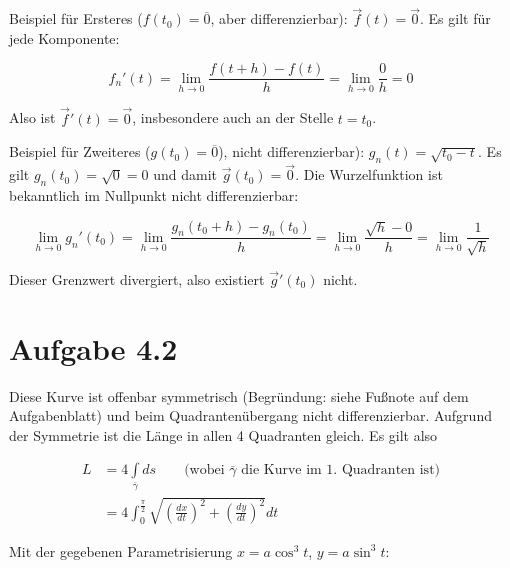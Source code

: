 \documentclass[a4paper,german,12pt,smallheadings]{scrartcl}
\begin{document}
\begin{enumerate}[(1)]
    Beispiel für Ersteres ($f(t_0) = \overline{0}$, aber differenzierbar): $\vec{f}(t) = \vec{0}$. Es gilt für jede Komponente:

    \begin{equation*}
      f_n'(t) = \lim_{h \to 0} \frac{f(t + h) - f(t)}{h} = \lim_{h \to 0} \frac{0}{h} = 0
    \end{equation*}

    Also ist $\vec{f}'(t) = \vec{0}$, insbesondere auch an der Stelle $t = t_0$.

    Beispiel für Zweiteres ($g(t_0) = \overline{0}$), nicht differenzierbar): $g_n(t) = \sqrt{t_0-t}$. Es gilt $g_n(t_0) =
    \sqrt{0} = 0$ und damit $\vec{g}(t_0) = \vec{0}$. Die Wurzelfunktion ist
    bekanntlich im Nullpunkt nicht differenzierbar:

    \begin{equation*}
      \lim_{h \to 0} g_n'(t_0) = \lim_{h \to 0} \frac{g_n(t_0 + h) - g_n(t_0)}{h} = 
      \lim_{h \to 0} \frac{\sqrt{h} - 0}{h} = \lim_{h \to 0} \frac{1}{\sqrt{h}}
    \end{equation*}

    Dieser Grenzwert divergiert, also existiert $\vec{g}'(t_0)$ nicht.
\end{enumerate}

\section*{Aufgabe 4.2}

Diese Kurve ist offenbar symmetrisch (Begründung: siehe Fußnote auf dem
Aufgabenblatt) und beim Quadrantenübergang nicht differenzierbar. Aufgrund der
Symmetrie ist die Länge in allen 4 Quadranten gleich. Es gilt also

\begin{align*}
  L &= 4 \int\limits_{\overline{\gamma}}  ds \qquad \text{(wobei }\overline{\gamma}\text{ die Kurve im 1. Quadranten ist)} \\
    &= 4 \int_0^{\frac{\pi}{2}} \sqrt{\left(\frac{dx}{dt}\right)^2 + \left(\frac{dy}{dt}\right)^2} dt
\end{align*}

Mit der gegebenen Parametrisierung $x=a \cos^3 t$, $y = a \sin^3 t$:
\end{document}
